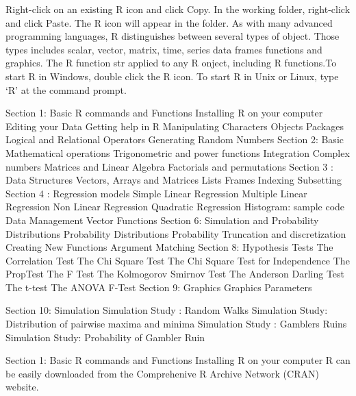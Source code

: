 \begin{frame}
\begin{frame}
Right-click on an existing R icon and click Copy.   In the working folder, right-click and click Paste. The R icon will appear in the folder. As with many advanced programming languages, R distinguishes between several types of object. Those types includes scalar, vector, matrix, time, series data frames functions and graphics. The R function str applied to any R onject, including R functions.To start R in Windows, double click the R icon. To start R in Unix or Linux, type ‘R’ at the command prompt. 

\end{frame}
\begin{frame}

Section 1: Basic R commands and Functions
Installing R on your computer
Editing your Data
Getting help in R
Manipulating Characters
Objects
Packages
Logical and Relational Operators
Generating Random Numbers
Section 2: Basic Mathematical operations
Trigonometric and power functions
Integration
Complex numbers
Matrices and Linear Algebra
Factorials and permutations
Section 3 : Data Structures
Vectors, Arrays and Matrices
Lists
Frames
Indexing
Subsetting
Section 4 : Regression models
Simple Linear Regression
Multiple Linear Regression
Non Linear Regression
Quadratic Regression
Histogram: sample code
Data Management
Vector Functions
Section 6: Simulation and Probability Distributions
Probability Distributions
Probability
Truncation and discretization
Creating New Functions
Argument Matching
Section 8: Hypothesis Tests
The Correlation Test
The Chi Square Test
The Chi Square Test for Independence
The PropTest
The F Test
The Kolmogorov Smirnov Test
The Anderson Darling Test
The t-test
The ANOVA F-Test
Section 9: Graphics
Graphics Parameters

Section 10: Simulation
Simulation Study : Random Walks
Simulation Study: Distribution of pairwise maxima and minima
Simulation Study : Gamblers Ruins
Simulation Study: Probability of Gambler Ruin

\end{frame}
\begin{frame}

Section 1: Basic R commands and Functions
Installing R on your computer
R can be easily downloaded from the Comprehenive R Archive Network (CRAN) website.
\end{frame}
\begin{frame}


\end{frame}
\end{frame}
